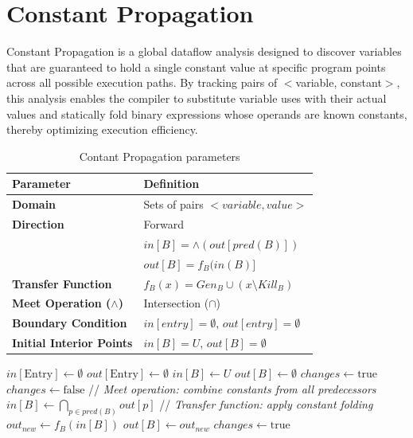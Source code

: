 \section{Constant Propagation}

Constant Propagation is a global dataflow analysis designed to discover variables that are guaranteed to hold a single
constant value at specific program points across all possible execution paths. By tracking pairs of $<$variable, constant$>$, 
this analysis enables the compiler to substitute variable uses with their actual values and statically fold 
binary expressions whose operands are known constants, thereby optimizing execution efficiency.

\begin{table}[H]
\centering
\renewcommand{\arraystretch}{1.5}
\begin{tabular}{ll}
\toprule
\textbf{Parameter} & \textbf{Definition} \\
\midrule
\textbf{Domain} & Sets of pairs $<variable, value>$\\
\textbf{Direction} & Forward \\ & $in[B] = \wedge(out[pred(B)])$ \\ & $out[B] = f_B(in(B)]$ \\
\textbf{Transfer Function} & $f_B(x) = Gen_B \cup (x \setminus Kill_B)$ \\
\textbf{Meet Operation ($\wedge$)} & Intersection ($\cap$) \\
\textbf{Boundary Condition} & $in[entry] = \emptyset$, $out[entry] = \emptyset$ \\
\textbf{Initial Interior Points} & $in[B] = U$, $out[B] = \emptyset$ \\
\bottomrule
\end{tabular}
\caption{Contant Propagation parameters}
\end{table}

\begin{algorithm}[H]
\caption{Constant Propagation}
\begin{algorithmic}[1]
\State $in[\text{Entry}] \gets \emptyset$
\State $out[\text{Entry}] \gets \emptyset$
\Statex
{}
    \State $in[B] \gets U$
    \State $out[B] \gets \emptyset$
\EndFor
\Statex
\State $changes \gets \text{true}$
    \State $changes \gets \text{false}$
        \State // \textit{Meet operation: combine constants from all predecessors}
        \State $in[B] \gets \bigcap_{p \in pred(B)} out[p]$
        \Statex
        \State // \textit{Transfer function: apply constant folding}
        \State $out_{new} \gets f_B(in[B])$
        \Statex
            \State $out[B] \gets out_{new}$
            \State $changes \gets \text{true}$
        \EndIf
    \EndFor
\EndWhile
\end{algorithmic}
\end{algorithm}

